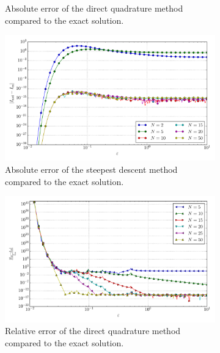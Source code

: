 \documentclass[a4paper,10pt]{article}
\begin{document}
\begin{figure}[ht!]
\begin{subfigure}[t]{0.5\linewidth}
    \caption{Absolute error of the direct quadrature method compared to the exact solution.}
    \label{fig:tp_1d_conv_eps_8_8_err_qr}
  \end{subfigure}
  \begin{subfigure}[t]{0.5\linewidth}
    \includegraphics[width=\linewidth]{./plots/tp_1d_conv_eps_8_8_err_nsd.pdf}
    \caption{Absolute error of the steepest descent method compared to the exact solution.}
    \label{fig:tp_1d_conv_eps_8_8_err_nsd}
  \end{subfigure}
  \begin{subfigure}[t]{0.5\linewidth}
    \includegraphics[width=\linewidth]{./plots/tp_1d_conv_eps_8_8_err_rel_qr.pdf}
    \caption{Relative error of the direct quadrature method compared to the exact solution.}
    \label{fig:tp_1d_conv_eps_8_8_err_rel_qr}
  \end{subfigure}
  \begin{subfigure}[t]{0.5\linewidth}

\end{subfigure}
\end{figure}
\end{document}
